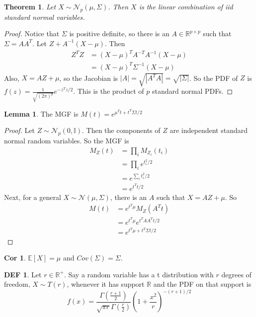 \documentclass{article}
\newtheorem{theorem}{Theorem}
\theoremstyle{definition}\newtheorem{definition}{DEF}
\theoremstyle{definition}\newtheorem{example}{Ex}
\theoremstyle{lemma}\newtheorem{lemma}{Lemma}
\theoremstyle{corrolary}\newtheorem{corrolary}{Cor}
\begin{document}
\begin{theorem}
Let $X\sim \mathcal{N}_p(\mu, \Sigma)$.
Then $X$ is the linear combination of iid standard normal variables.
\end{theorem}
\begin{proof}
Notice that $\Sigma$ is positive definite, so there is an $A\in \mathbb{R}^{p\times p}$ such that $\Sigma=AA^T$.
Let $Z+A^{-1}(X-\mu)$.
Then
\begin{align*}
Z^T Z&=(X-\mu)^T A^{-T}A^{-1}(X-\mu)\\
&=(X-\mu)^T\Sigma^{-1}(X-\mu)
\end{align*}
Also, $X=AZ+\mu$, so the Jacobian is $|A|=\sqrt{|A^TA|}=\sqrt{|\Sigma|}$.
So the PDF of $Z$ is $f(z)=\frac{1}{\sqrt{(2\pi)^p}}e^{-z^Tz/2}$.
This is the product of $p$ standard normal PDFs.
\end{proof}

\begin{lemma}
The MGF is $M(t)=e^{\mu^T t+t^T\Sigma t/2}$
\end{lemma}
\begin{proof}
Let $Z\sim \mathcal{N}_p(0,\mathbb{I})$.
Then the components of $Z$ are independent standard normal random variables.
So the MGF is
\begin{align*}
M_Z(t)&=\prod_i M_{Z_i}(t_i)\\
&=\prod_i e^{t_i^2 /2}\\
&=e^{\sum_i t_i^2/2}\\
&=e^{t^T t/2}
\end{align*}
Next, for a general $X\sim \mathcal{N}(\mu, \Sigma)$, there is an $A$ such that $X=AZ+\mu$.
So
\begin{align*}
M(t)&=e^{t^T\mu}M_Z(A^Tt)\\
&=e^{t^T\mu}e^{t^TAA^Tt/2}\\
&=e^{t^T\mu +t^T\Sigma t/2}
\end{align*}
\end{proof}
\begin{corrolary}
$\mathbb{E}[X]=\mu$ and $Cov(\Sigma)=\Sigma$.
\end{corrolary}

\begin{definition}
Let $r\in \mathbb{R}^+$.
Say a random variable has a t distribution with $r$ degrees of freedom, $X\sim T(r)$, whenever it has support $\mathbb{R}$ and the PDF on that support is
\begin{equation}
f(x)=\frac{\Gamma \left( \frac{r+1}{2}\right)}{\sqrt{\pi r}\Gamma\left(\frac{r}{2} \right)}\left( 1+\frac{x^2}{r}\right)^{-(r+1)/2}
\end{equation}
\end{definition}
\end{document}
